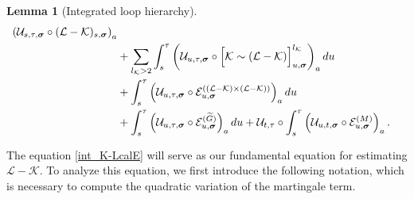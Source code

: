 \documentclass[10pt,reqno]{article}
\theoremstyle{plain} %
\newtheorem{lemma}[theorem]{Lemma}
\theoremstyle{remark}
\numberwithin{equation}{section}
\begin{document}
\begin{lemma}[Integrated loop hierarchy]
\begin{align}
    \left(\mathcal{U}_{s, \tau, \boldsymbol{\sigma}} \circ (\mathcal{L} - \mathcal{K})_{s, \boldsymbol{\sigma}}\right)_{\textbf{a}}  \nonumber \\
    &+ \sum_{l_\mathcal{K} > 2} \int_{s}^\tau \left(\mathcal{U}_{u, \tau, \boldsymbol{\sigma}} \circ \Big[\mathcal{K} \sim (\mathcal{L} - \mathcal{K})\Big]^{l_\mathcal{K}}_{u, \boldsymbol{\sigma}}\right)_{\textbf{a}} du  \nonumber \\
    &+ \int_{s}^\tau \left(\mathcal{U}_{u, \tau, \boldsymbol{\sigma}} \circ \mathcal{E}^{((\mathcal{L} - \mathcal{K}) \times (\mathcal{L} - \mathcal{K}))}_{u, \boldsymbol{\sigma}}\right)_{\textbf{a}} du  \nonumber \\
    &+ \int_{s}^\tau \left(\mathcal{U}_{u, \tau, \boldsymbol{\sigma}} \circ \mathcal{E}^{(\widetilde{G})}_{u, \boldsymbol{\sigma}}\right)_{\textbf{a}} du + 
    {\cal U}_{t,\tau}\circ \int_{s}^\tau \left(\mathcal{U}_{u, t, \boldsymbol{\sigma}} \circ \mathcal{E}^{(M)}_{u, \boldsymbol{\sigma}}\right)_{\textbf{a}}
    .
\end{align}
  
 
\end{lemma}

The equation \eqref{int_K-LcalE} will serve as our fundamental equation for estimating $\mathcal{L} - \mathcal{K}$. To analyze this equation, we first introduce the following notation, which is necessary to compute the quadratic variation of the martingale term.
\end{document}
